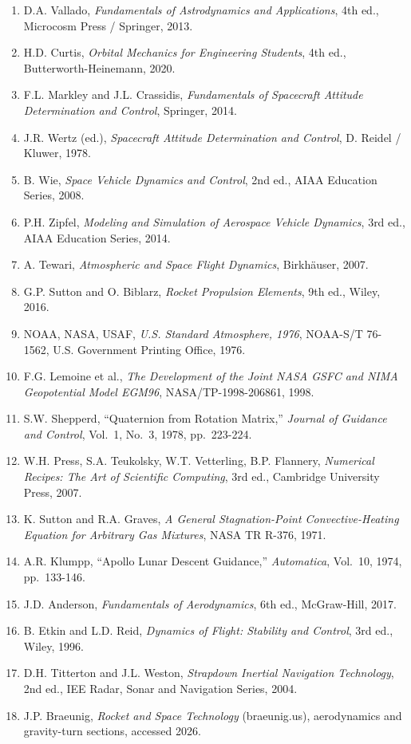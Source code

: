 \documentclass[12pt,a4paper]{article}
\begin{document}
\begin{enumerate}
\item D.A. Vallado, \textit{Fundamentals of Astrodynamics and Applications}, 4th ed., Microcosm Press / Springer, 2013.
\item H.D. Curtis, \textit{Orbital Mechanics for Engineering Students}, 4th ed., Butterworth-Heinemann, 2020.
\item F.L. Markley and J.L. Crassidis, \textit{Fundamentals of Spacecraft Attitude Determination and Control}, Springer, 2014.
\item J.R. Wertz (ed.), \textit{Spacecraft Attitude Determination and Control}, D. Reidel / Kluwer, 1978.
\item B. Wie, \textit{Space Vehicle Dynamics and Control}, 2nd ed., AIAA Education Series, 2008.
\item P.H. Zipfel, \textit{Modeling and Simulation of Aerospace Vehicle Dynamics}, 3rd ed., AIAA Education Series, 2014.
\item A. Tewari, \textit{Atmospheric and Space Flight Dynamics}, Birkhäuser, 2007.
\item G.P. Sutton and O. Biblarz, \textit{Rocket Propulsion Elements}, 9th ed., Wiley, 2016.
\item NOAA, NASA, USAF, \textit{U.S. Standard Atmosphere, 1976}, NOAA-S/T 76-1562, U.S. Government Printing Office, 1976.
\item F.G. Lemoine et al., \textit{The Development of the Joint NASA GSFC and NIMA Geopotential Model EGM96}, NASA/TP-1998-206861, 1998.
\item S.W. Shepperd, ``Quaternion from Rotation Matrix,'' \textit{Journal of Guidance and Control}, Vol.~1, No.~3, 1978, pp.~223-224.
\item W.H. Press, S.A. Teukolsky, W.T. Vetterling, B.P. Flannery, \textit{Numerical Recipes: The Art of Scientific Computing}, 3rd ed., Cambridge University Press, 2007.
\item K. Sutton and R.A. Graves, \textit{A General Stagnation-Point Convective-Heating Equation for Arbitrary Gas Mixtures}, NASA TR R-376, 1971.
\item A.R. Klumpp, ``Apollo Lunar Descent Guidance,'' \textit{Automatica}, Vol.~10, 1974, pp.~133-146.
\item J.D. Anderson, \textit{Fundamentals of Aerodynamics}, 6th ed., McGraw-Hill, 2017.
\item B. Etkin and L.D. Reid, \textit{Dynamics of Flight: Stability and Control}, 3rd ed., Wiley, 1996.
\item D.H. Titterton and J.L. Weston, \textit{Strapdown Inertial Navigation Technology}, 2nd ed., IEE Radar, Sonar and Navigation Series, 2004.
\item J.P. Braeunig, \textit{Rocket and Space Technology} (braeunig.us), aerodynamics and gravity-turn sections, accessed 2026.
\end{enumerate}
\end{document}
